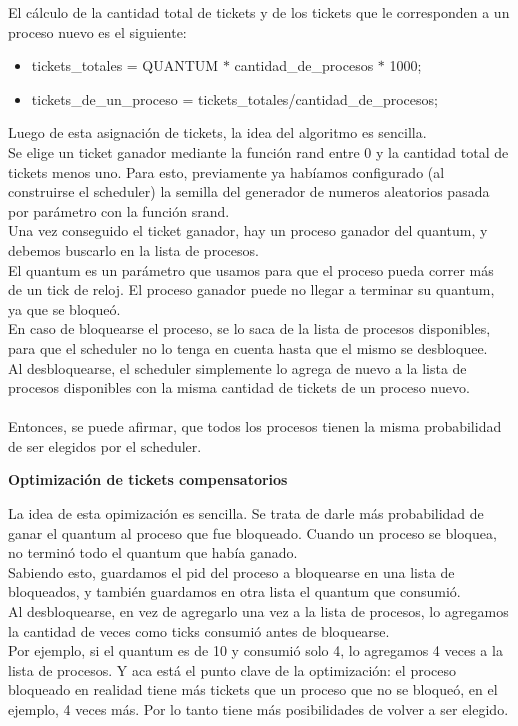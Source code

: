 \indent El cálculo de la cantidad total de tickets y de los tickets que le corresponden a un proceso nuevo es el siguiente:\\
\begin{itemize}
 \item tickets\_totales = QUANTUM $*$ cantidad\_de\_procesos $*$ 1000;
 \item tickets\_de\_un\_proceso = tickets\_totales/cantidad\_de\_procesos;
\end{itemize}

\indent Luego de esta asignación de tickets, la idea del algoritmo es sencilla. \\
Se elige un ticket ganador mediante la función rand entre 0 y la cantidad total de tickets menos uno. Para esto, previamente ya habíamos configurado (al construirse el scheduler) la semilla del
generador de numeros aleatorios pasada por parámetro con la función srand.\\
Una vez conseguido el ticket ganador, hay un proceso ganador del quantum, y debemos buscarlo en la lista de procesos. \\
El quantum es un parámetro que usamos para que el proceso pueda correr más de un tick de reloj. 
El proceso ganador puede no llegar a terminar su quantum, ya que se bloqueó. \\
En caso de bloquearse el proceso, se lo saca de la lista de procesos disponibles, 
para que el scheduler no lo tenga en cuenta hasta que el mismo se desbloquee. \\
Al desbloquearse, el scheduler simplemente lo agrega de nuevo a la lista de procesos disponibles con la misma cantidad de
tickets de un proceso nuevo.\\\\

Entonces, se puede afirmar, que todos los procesos tienen la misma probabilidad de ser elegidos por el scheduler.\\

\begin{center}
 \textbf{Optimización de tickets compensatorios}
\end{center}

La idea de esta opimización es sencilla. Se trata de darle más probabilidad de ganar el quantum al proceso que fue bloqueado.
Cuando un proceso se bloquea, no terminó todo el quantum que había ganado.\\
Sabiendo esto, guardamos el pid del proceso a bloquearse en una lista de bloqueados, y también guardamos en otra lista 
el quantum que consumió.\\
Al desbloquearse, en vez de agregarlo una vez a la lista de procesos, lo agregamos la cantidad de veces como ticks 
consumió antes de bloquearse. \\
Por ejemplo, si el quantum es de 10 y consumió solo 4, lo agregamos 4 veces a la lista de procesos. 
Y aca está el punto clave de la optimización: el proceso bloqueado en realidad tiene más tickets que un proceso 
que no se bloqueó, en el ejemplo, 4 veces más. Por lo tanto tiene más posibilidades de volver a ser elegido.\\